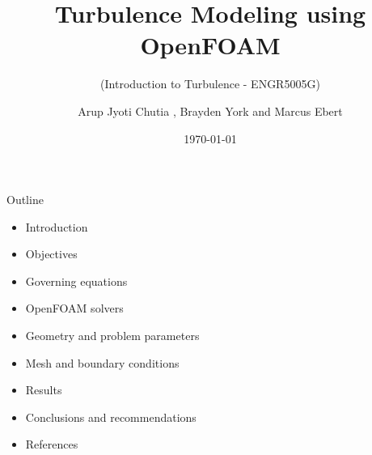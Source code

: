 \documentclass [xcolor=svgnames, t] {beamer}
\title[Turbulence Modeling (Group Project)]{Turbulence Modeling using OpenFOAM}
\subtitle{(Introduction to Turbulence - ENGR5005G)}
\institute[]{Mechanical Engineering \\Ontario Tech University }
\author[Arup Jyoti Chutia]{
	Arup Jyoti Chutia ,
	Brayden York and
	Marcus Ebert }
\institute[]{Mechanical Engineering \\Ontario Tech University }
\date{\today}
\begin{document}
\begin{frame}
 \titlepage   
\end{frame}









\begin{frame}{Outline}
\vspace{1cm}
\begin{center}
   \begin{itemize}
     \item Introduction
     \item Objectives
     \item Governing equations
     \item OpenFOAM solvers
     \item Geometry and problem parameters
     \item Mesh and boundary conditions
     \item Results
     \item Conclusions and recommendations
     \item References
 \end{itemize} 
\end{center}
 
\end{frame}
\end{document}
